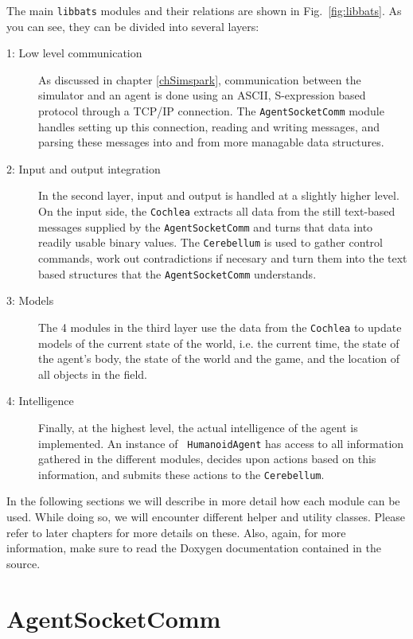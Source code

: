 The main {\tt libbats} modules and their relations are shown in
Fig.~\ref{fig:libbats}. As you can see, they can be divided into
several layers:
\begin{description}
\item[1: Low level communication] As discussed in chapter
  \ref{chSimspark}, communication between the simulator and an agent
  is done using an ASCII, S-expression based protocol through a TCP/IP
  connection. The {\tt AgentSocketComm} module handles setting up this
  connection, reading and writing messages, and parsing these messages
  into and from more managable data structures.
\item[2: Input and output integration] In the second layer, input and
  output is handled at a slightly higher level. On the input side, the
  {\tt Cochlea} extracts all data from the still text-based messages
  supplied by the {\tt AgentSocketComm} and turns that data into
  readily usable binary values. The {\tt Cerebellum} is used to gather
  control commands, work out contradictions if necesary and turn them
  into the text based structures that the {\tt AgentSocketComm}
  understands.
\item[3: Models] The 4 modules in the third layer use the data from
  the {\tt Cochlea} to update models of the current state of the
  world, i.e. the current time, the state of the agent's body, the
  state of the world and the game, and the location of all objects in
  the field.
\item[4: Intelligence] Finally, at the highest level, the actual
  intelligence of the agent is implemented. An instance of {\tt
    HumanoidAgent} has access to all information gathered in the
  different modules, decides upon actions based on this information,
  and submits these actions to the {\tt Cerebellum}.
\end{description}

In the following sections we will describe in more detail how each
module can be used. While doing so, we will encounter different helper
and utility classes. Please refer to later chapters for more details
on these. Also, again, for more information, make sure to read the
Doxygen documentation contained in the source.

\lstset{numbers=none}

\section{AgentSocketComm}
\label{secSocketComm}


